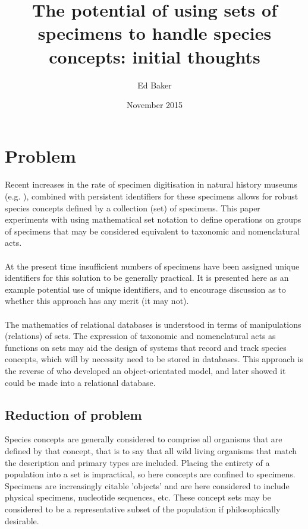 \documentclass{article}
\title{The potential of using sets of specimens to handle species concepts: initial thoughts}
\author{Ed Baker}
\date{November 2015}
\begin{document}
   \maketitle
   \tableofcontents
   \section{Problem}
   \paragraph{}
   Recent increases in the rate of specimen digitisation in natural history museums (e.g. \cite{blagoderov2012}), combined with persistent identifiers for these specimens \cite{guralnick2015} allows for robust species concepts defined by a collection (set) of specimens. This paper experiments with using mathematical set notation to define operations on groups of specimens that may be considered equivalent to taxonomic and nomenclatural acts.
   \paragraph{}
   At the present time insufficient numbers of specimens have been assigned unique identifiers for this solution to be generally practical. It is presented here as an example potential use of unique identifiers, and to encourage discussion as to whether this approach has any merit (it may not).
   \paragraph{}
   The mathematics of relational databases is understood in terms of manipulations (relations) of sets. The expression of taxonomic and nomenclatural acts as functions on sets may aid the design of systems that record and track species concepts, which will by necessity need to be stored in databases. This approach is the reverse of \cite{ytow2001} who developed an object-orientated model, and later showed it could be made into a relational database.
   \subsection{Reduction of problem}
   Species concepts are generally considered to comprise all organisms that are defined by that concept, that is to say that all wild living organisms that match the description and primary types are included. Placing the entirety of a population into a set is impractical, so here concepts are confined to specimens. Specimens are increasingly citable 'objects' and are here considered to include physical specimens, nucleotide sequences, etc. These concept sets may be considered to be a representative subset of the population if philosophically desirable.
\end{document}
